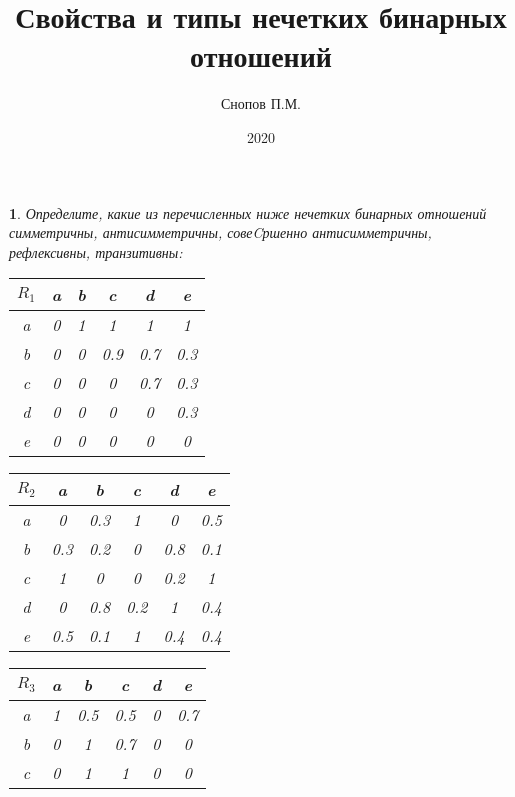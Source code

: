 \documentclass[11pt,a4paper,oneside]{article}
\title{Свойства и типы нечетких бинарных отношений}
\date{2020}
\author{Снопов П.М.}
\newenvironment{problem}{
	\medskip
	\begin{problem-internal}
	}{
	\end{problem-internal}
}
\newtheorem{problem-internal}{}
\newcommand{\+}{$\boldsymbol{+}$}
\begin{document}
	\maketitle
	
	
	
	
	\begin{problem}
		Определите, какие из перечисленных ниже нечетких бинарных отношений симметричны,
		антисимметричны, совеCршенно антисимметричны, рефлексивны, транзитивны:
		\begin{table}[!htbp]
			\centering
			\begin{tabular}{|c|c|c|c|c|c|}
				\hline
				$R_1$ & a & b & c   & d   & e   \\ \hline
				a     & 0 & 1 & 1   & 1   & 1   \\ \hline
				b     & 0 & 0 & 0.9 & 0.7 & 0.3 \\ \hline
				c     & 0 & 0 & 0   & 0.7 & 0.3 \\ \hline
				d     & 0 & 0 & 0   & 0   & 0.3 \\ \hline
				e     & 0 & 0 & 0   & 0   & 0   \\ \hline
			\end{tabular}
			\quad
			\centering
			\begin{tabular}{|c|c|c|c|c|c|}
				\hline
				$R_2$ & a   & b   & c   & d   & e   \\ \hline
				a     & 0   & 0.3 & 1   & 0   & 0.5 \\ \hline
				b     & 0.3 & 0.2 & 0   & 0.8 & 0.1 \\ \hline
				c     & 1   & 0   & 0   & 0.2 & 1   \\ \hline
				d     & 0   & 0.8 & 0.2 & 1   & 0.4 \\ \hline
				e     & 0.5 & 0.1 & 1   & 0.4 & 0.4 \\ \hline
			\end{tabular}
		\end{table}
		\begin{table}[!htbp]
			\centering
			\begin{tabular}{|c|c|c|c|c|c|}
				\hline
				$R_3$ & a & b   & c   & d & e   \\ \hline
				a     & 1 & 0.5 & 0.5 & 0 & 0.7 \\ \hline
				b     & 0 & 1   & 0.7 & 0 & 0   \\ \hline
				c     & 0 & 1   & 1   & 0 & 0   \\ \hline

\end{tabular}
\end{table}
\end{problem}
\end{document}
